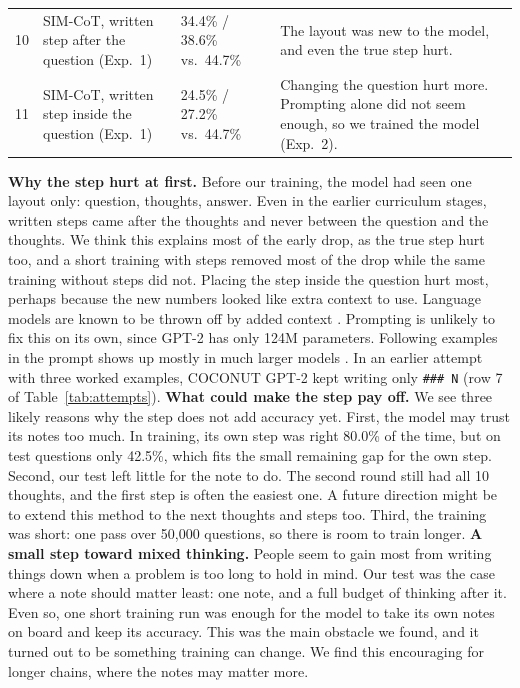 \documentclass[10pt,letterpaper]{article}
\newcommand{\step}[1]{\texttt{\small #1}}
\begin{document}
\begin{table}[!t]
\begin{center}
\begin{tabular}{rp{4.6cm}p{3.3cm}p{8.0cm}}
10 & SIM-CoT, written step after the question (Exp.~1) & 34.4\% / 38.6\% vs.\ 44.7\% & The layout was new to the model, and even the true step hurt. \\
11 & SIM-CoT, written step inside the question (Exp.~1) & 24.5\% / 27.2\% vs.\ 44.7\% & Changing the question hurt more. Prompting alone did not seem enough, so we trained the model (Exp.~2). \\
\bottomrule
\end{tabular}
\end{center}
\end{table}

\textbf{Why the step hurt at first.} Before our training, the model had seen one layout only: question, thoughts,
answer. Even in the earlier curriculum stages, written steps came after the thoughts and never between the question and the thoughts. We think this explains most of the early drop, as the true step hurt
too, and a short training with steps removed most of the drop while the same training without steps did not. Placing the step inside the question hurt most, perhaps
because the new numbers looked like extra context to use. Language models are known to be thrown off by added
context \citep{shi2023large}. Prompting is unlikely to fix this on its own, since GPT-2 has only 124M parameters.
Following examples in the prompt shows up mostly in much larger models \citep{brown2020language}. In an earlier
attempt with three worked examples, COCONUT GPT-2 kept writing only \step{\#\#\# N} (row 7 of
Table~\ref{tab:attempts}).
\newline \noindent
\textbf{What could make the step pay off.} We see three likely reasons why the step does not add accuracy yet. \newline
First, the model may trust its notes too much. In training, its own step was right 80.0\% of the time, but on test questions only 42.5\%, which fits the small remaining gap for the own step. \newline
Second, our test left little for the note to do. The second round still had all 10 thoughts, and the first step is often the easiest one. A future direction might be to extend this method to the next thoughts and steps too. \newline
Third, the training was short: one pass over 50{,}000 questions, so there is room to train longer.
\newline \noindent
\textbf{A small step toward mixed thinking.} People seem to gain most from writing things down when a problem is too long to hold in mind. Our test was the case where a note should matter least: one note, and a full budget of thinking after it. Even so, one short training run was enough for the model to take its own notes on board and keep its accuracy. This was the main obstacle we found, and it turned out to be something training can change. We find this encouraging for longer chains, where the notes may matter more.
\end{document}
